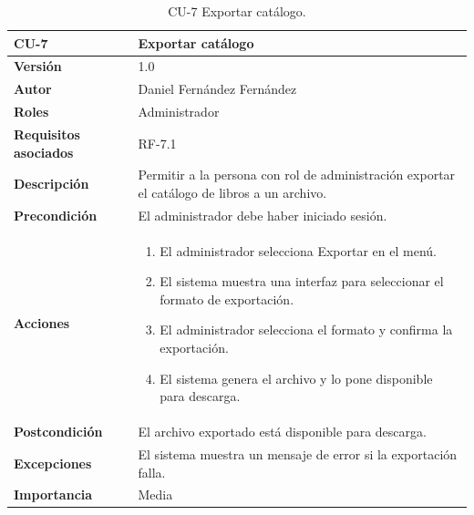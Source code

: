 \begin{table}[p]
        \centering
        \begin{tabularx}{\linewidth}{ p{} p{} }
            \toprule
            \textbf{CU-7} & \textbf{Exportar catálogo}\\
            \toprule
            \textbf{Versión} & 1.0 \\
            \textbf{Autor} & Daniel Fernández Fernández \\
            \textbf{Roles} & Administrador \\
            \textbf{Requisitos asociados} & RF-7.1 \\
            \textbf{Descripción} & Permitir a la persona con rol de administración exportar el catálogo de libros a un archivo. \\
            \textbf{Precondición} & El administrador debe haber iniciado sesión. \\
            \textbf{Acciones} &
            \begin{enumerate}
            \def\labelenumi{\arabic{enumi}.}
            \tightlist
            \item El administrador selecciona Exportar en el menú.
            \item El sistema muestra una interfaz para seleccionar el formato de exportación.
            \item El administrador selecciona el formato y confirma la exportación.
            \item El sistema genera el archivo y lo pone disponible para descarga.
            \end{enumerate}\\
            \textbf{Postcondición} & El archivo exportado está disponible para descarga. \\
            \textbf{Excepciones} & El sistema muestra un mensaje de error si la exportación falla. \\
            \textbf{Importancia} & Media \\
            \bottomrule
        \end{tabularx}
        \caption{CU-7 Exportar catálogo.}
\end{table}

